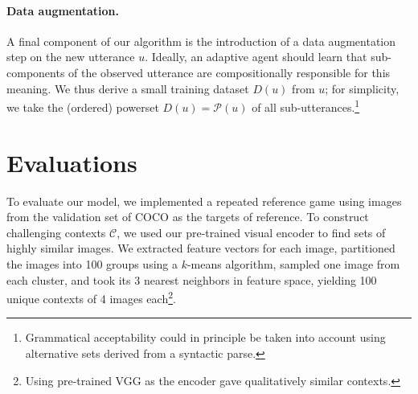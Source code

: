 \paragraph{Data augmentation.} A final component of our algorithm is the introduction of a data augmentation step on the new utterance $u$.
Ideally, an adaptive agent should learn that sub-components of the observed utterance are compositionally responsible for this meaning.
We thus derive a small training dataset $D(u)$ from $u$; 
for simplicity, we take the (ordered) powerset $D(u) = \mathcal{P}(u)$ of all sub-utterances.\footnote{Grammatical acceptability could in principle be taken into account using alternative sets derived from a syntactic parse.}


\section{Evaluations}

To evaluate our model, we implemented a repeated reference game using images from the validation set of COCO \cite{lin2014microsoft} as the targets of reference.
To construct challenging contexts $\mathcal{C}$, we used our pre-trained visual encoder to find sets of highly similar images. 
We extracted feature vectors for each image, partitioned the images into 100 groups using a $k$-means algorithm, sampled one image from each cluster, and took its 3 nearest neighbors in feature space, yielding 100 unique contexts of 4 images each\footnote{Using pre-trained VGG as the encoder gave qualitatively similar contexts.}.

